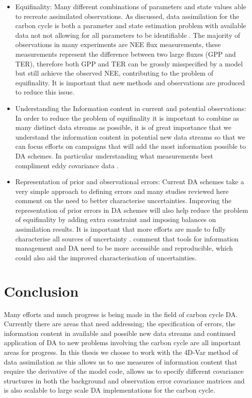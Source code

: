 \documentclass[12pt]{article}
\begin{document}
\begin{itemize}

\item Equifinality: Many different combinations of parameters and state values able to recreate assimilated observations. As discussed, data assimilation for the carbon cycle is both a parameter and state estimation problem with available data not not allowing for all parameters to be identifiable \citep{Luo2009}. The majority of observations in many experiments are NEE flux measurements, these measurements represent the difference between two large fluxes (GPP and TER), therefore both GPP and TER can be grossly misspecified by a model but still achieve the observed NEE, contributing to the problem of equifinality. It is important that new methods and observations are produced to reduce this issue.

\item Understanding the Information content in current and potential observations: In order to reduce the problem of equifinality it is important to combine as many distinct data streams as possible, it is of great importance that we understand the information content in potential new data streams so that we can focus efforts on campaigns that will add the most information possible to DA schemes. In particular understanding what measurements best compliment eddy covariance data \citep{rayner2010current, williams2009improving}.

\item Representation of prior and observational errors: Current DA schemes take a very simple approach to defining errors and many studies reviewed here comment on the need to better characterise uncertainties. Improving the representation of prior errors in DA schemes will also help reduce the problem of equifinality by adding extra constraint and imposing balances on assimilation results. It is important that more efforts are made to fully characterise all sources of uncertainty \citep{Keenan2011, raupach2005model}. \citet{Dietze2013} comment that tools for information management and DA need to be more accessible and reproducible, which could also aid the improved characterisation of uncertainties.
\end{itemize}

\section{Conclusion} 

Many efforts and much progress is being made in the field of carbon cycle DA. Currently there are areas that need addressing; the specification of errors, the information content in available and possible new data streams and continued application of DA to new problems involving the carbon cycle are all important areas for progress. In this thesis we choose to work with the 4D-Var method of data assimilation as this allows us to use measures of information content that require the derivative of the model code, allows us to specify different covariance structures in both the background and observation error covariance matrices and is also scalable to large scale DA implementations for the carbon cycle. 
\end{document}
